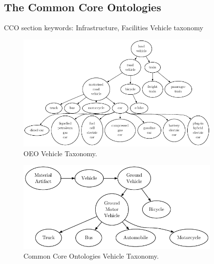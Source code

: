 \subsection{The Common Core Ontologies}

CCO section keywords: Infrastructure, Facilities Vehicle taxonomy

\begin{figure}[h]
    \caption{OEO Vehicle Taxonomy.}
    \centering
    \includegraphics[width=0.9\textwidth]{images/OEOLVehicles}
\end{figure}

\begin{figure}[h]
    \caption{Common Core Ontologies Vehicle Taxonomy.}
    \centering
    \includegraphics[width=0.9\textwidth]{images/CCOVehicles}
\end{figure}


